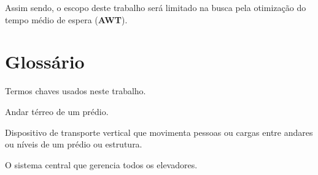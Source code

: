  Assim sendo, o escopo deste trabalho será limitado na busca pela otimização do tempo médio de espera (\textbf{AWT}).

\section{Glossário}

Termos chaves usados neste trabalho.

\begin{description}[leftmargin=!,labelwidth=\widthof{\bfseries Sistema de Controle}]
  \item[Lobby]                Andar térreo de um prédio.
  \item[Elevador]             Dispositivo de transporte vertical que movimenta pessoas ou cargas entre andares ou níveis de um prédio ou estrutura.
  \item[Sistema de Controle]  O sistema central que gerencia todos os elevadores.
\end{description}